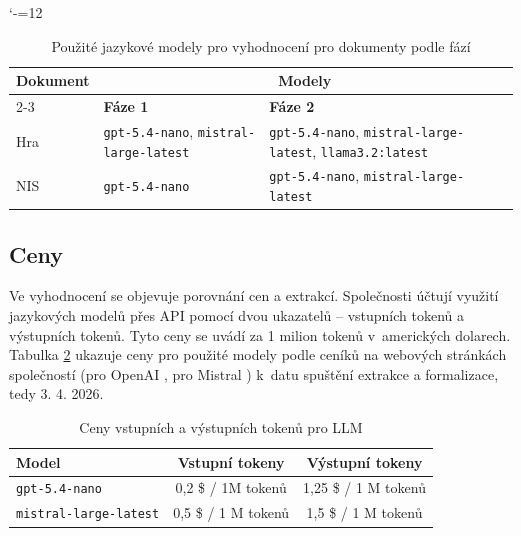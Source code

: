 \documentclass[czech, bc, kiv, he, iso690numb, pdf]{fasthesis}
\begin{document}
\begin{table}[h!]
\catcode`-=12
\centering
\caption{Použité jazykové modely pro vyhodnocení pro dokumenty podle fází}
\label{tab:pouzite-llms}
\begin{tabularx}{\textwidth}{l|XX}
\hline
\multicolumn{1}{c|}{\multirow{2}{*}{\textbf{Dokument}}} & \multicolumn{2}{c}{\textbf{Modely}}                                                                                                   \\ \cline{2-3} 
\multicolumn{1}{c|}{}                                   & \textbf{Fáze 1}                                      & \textbf{Fáze 2}                                                                \\ \hline\hline
Hra                                                     & \texttt{gpt-5.4-nano}, \texttt{mistral-large-latest} & \texttt{gpt-5.4-nano}, \texttt{mistral-large-latest}, \texttt{llama3.2:latest} \\
NIS                                                     & \texttt{gpt-5.4-nano} & \texttt{gpt-5.4-nano},  \texttt{mistral-large-latest}\\
\hline\hline
\end{tabularx}
\end{table}

\subsection{Ceny}
Ve vyhodnocení se objevuje porovnání cen a extrakcí. Společnosti účtují využití jazykových modelů přes API pomocí dvou ukazatelů -- vstupních tokenů a výstupních tokenů. Tyto ceny se uvádí za 1 milion tokenů v~amerických dolarech. Tabulka \ref{tab:ceny-za-api} ukazuje ceny pro použité modely podle ceníků na  webových stránkách společností (pro OpenAI \cite{gpt-api-pricing}, pro Mistral \cite{mistral-api-pricing}) k~datu spuštění extrakce a formalizace, tedy 3. 4. 2026.

\begin{table}[h!]
\centering
\caption{Ceny vstupních a výstupních tokenů pro LLM}
\label{tab:ceny-za-api}
\begin{tabular}{lcc}
\hline\hline
\textbf{Model} & \textbf{Vstupní tokeny} & \textbf{Výstupní tokeny} \\
\hline
\texttt{gpt-5.4-nano}   & 0,2 \$ / 1M tokenů & 1,25 \$ / 1 M tokenů \\
\texttt{mistral-large-latest}   & 0,5 \$ / 1 M tokenů & 1,5 \$ / 1 M tokenů \\
\hline\hline
\end{tabular}
\end{table}
\end{document}
